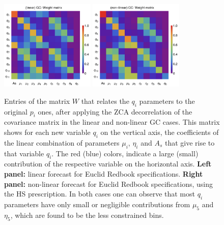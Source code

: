 \begin{figure}[htbp]
	\centering
	\includegraphics[width=0.4\textwidth]{Chapters/linear-nonlinear-MG-forecasts/figures/Decorrelations-GC/Weight_Matrix_ZCA_SquareNorm--_fiducialMGBin3_Euclid_GC_linearPK_}
	\includegraphics[width=0.4\textwidth]{Chapters/linear-nonlinear-MG-forecasts/figures/Decorrelations-GC/Weight_Matrix_ZCA_SquareNorm--_fiducialMGBin3_Euclid_GC_nonlinearPk__Zhao_}
	\caption[Weight matrix for ZCA decorrelation in a Euclid GC case.]{\label{fig:Wmat-ZCA-GC}
	Entries of the matrix $W$ that relates the $q_i$ parameters to the original $p_i$ ones, after applying the ZCA decorrelation of the covariance matrix in the linear and non-linear GC cases. This matrix shows for each new variable $q_i$ on the vertical axis, the coefficients of the linear combination of parameters $\mu_i$, $\eta_i$ and $A_s$ that give rise to that variable $q_i$. The red (blue) colors, indicate a large (small) contribution of the respective variable on the horizontal axis. \textbf{Left panel:} linear forecast for Euclid Redbook specifications.
\textbf{Right panel:} non-linear forecast for Euclid Redbook specifications, using the HS prescription.
In both cases one can observe that most $q_i$ parameters have only small or negligible contributions from $\mu_5$  and $\eta_5$, which are found to be the less constrained bins.
    }
\end{figure}


